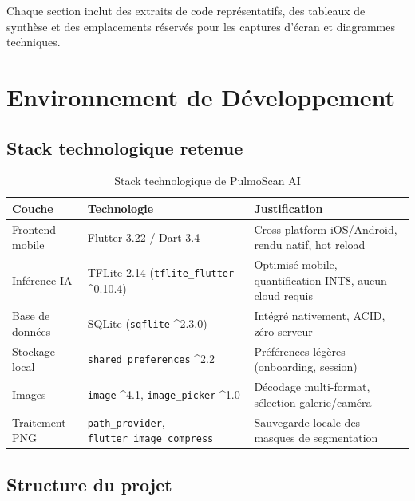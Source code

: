 \documentclass[12pt, a4paper]{report}
\begin{document}
Chaque section inclut des extraits de code représentatifs, des tableaux de
synthèse et des emplacements réservés pour les captures d'écran et diagrammes
techniques.

\chapter{Environnement de Développement}

\section{Stack technologique retenue}

\begin{table}[H]
  \centering
  \renewcommand{\arraystretch}{1.3}
  \begin{tabularx}{\linewidth}{L{3.2cm} L{3.5cm} X}
    \toprule
    \textbf{Couche} & \textbf{Technologie} & \textbf{Justification} \\
    \midrule
    Frontend mobile  & Flutter 3.22 / Dart 3.4 & Cross-platform iOS/Android,
                       rendu natif, hot reload \\
    Inférence IA     & TFLite 2.14 (\texttt{tflite\_flutter} \^{}0.10.4)
                     & Optimisé mobile, quantification INT8, aucun cloud
                       requis \\
    Base de données  & SQLite (\texttt{sqflite} \^{}2.3.0)
                     & Intégré nativement, ACID, zéro serveur \\
    Stockage local   & \texttt{shared\_preferences} \^{}2.2
                     & Préférences légères (onboarding, session) \\
    Images           & \texttt{image} \^{}4.1, \texttt{image\_picker} \^{}1.0
                     & Décodage multi-format, sélection galerie/caméra \\
    Traitement PNG   & \texttt{path\_provider}, \texttt{flutter\_image\_compress}
                     & Sauvegarde locale des masques de segmentation \\
    \bottomrule
  \end{tabularx}
  \caption{Stack technologique de PulmoScan AI}
  \label{tab:stack}
\end{table}

\section{Structure du projet}
\end{document}
